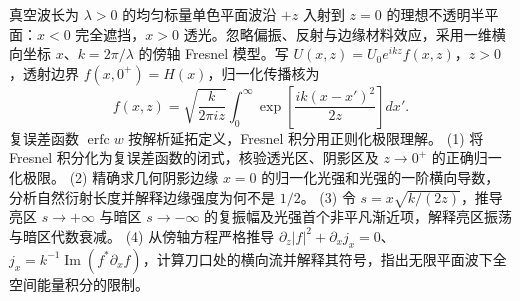真空波长为 \(\lambda>0\) 的均匀标量单色平面波沿 \(+z\) 入射到 \(z=0\) 的理想不透明半平面：\(x<0\) 完全遮挡，\(x>0\) 透光。忽略偏振、反射与边缘材料效应，采用一维横向坐标 \(x\)、\(k=2\pi/\lambda\) 的傍轴 Fresnel 模型。写 \(U(x,z)=U_0e^{ikz}f(x,z)\)，\(z>0\)，透射边界 \(f(x,0^+)=H(x)\)，归一化传播核为
\[
f(x,z)=\sqrt{\frac{k}{2\pi iz}}\int_0^\infty
\exp\!\left[\frac{ik(x-x')^2}{2z}\right]dx'.
\]
复误差函数 \(\operatorname{erfc}w\) 按解析延拓定义，Fresnel 积分用正则化极限理解。
(1) 将 Fresnel 积分化为复误差函数的闭式，核验透光区、阴影区及 \(z\to0^+\) 的正确归一化极限。
(2) 精确求几何阴影边缘 \(x=0\) 的归一化光强和光强的一阶横向导数，分析自然衍射长度并解释边缘强度为何不是 \(1/2\)。
(3) 令 \(s=x\sqrt{k/(2z)}\)，推导亮区 \(s\to+\infty\) 与暗区 \(s\to-\infty\) 的复振幅及光强首个非平凡渐近项，解释亮区振荡与暗区代数衰减。
(4) 从傍轴方程严格推导 \(\partial_z|f|^2+\partial_xj_x=0\)、\(j_x=k^{-1}\operatorname{Im}(f^*\partial_xf)\)，计算刀口处的横向流并解释其符号，指出无限平面波下全空间能量积分的限制。
